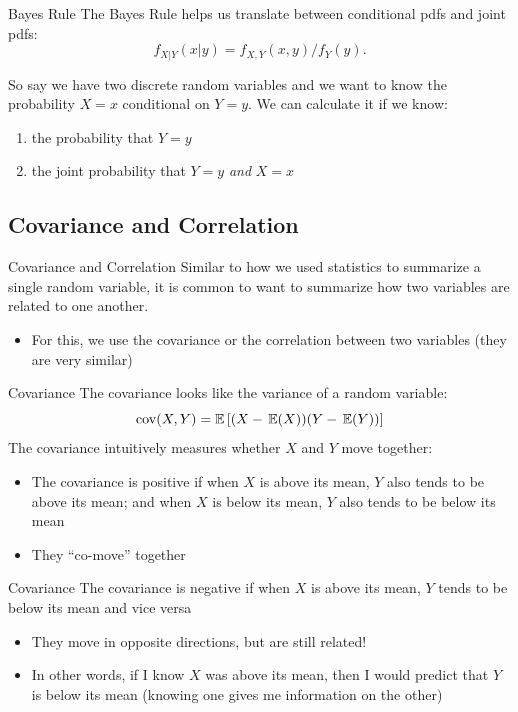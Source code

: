 \documentclass[aspectratio=169,t,11pt,table]{beamer}
\begin{document}
\begin{frame}{Bayes Rule}
  The \alert{Bayes Rule} helps us translate between conditional pdfs and joint pdfs:
  \[
    f_{X \vert Y}(x \vert y) = f_{X,Y}(x, y) / f_{Y}(y).
  \]
  
  \pause
  \bigskip
  So say we have two discrete random variables and we want to know the probability $X = x$ conditional on $Y = y$. We can calculate it if we know:
  \begin{enumerate}
    \item the probability that $Y = y$
    \item the joint probability that $Y = y$ \emph{and} $X = x$
  \end{enumerate}
\end{frame}

\subsection*{Covariance and Correlation}

\begin{frame}{Covariance and Correlation}
  Similar to how we used statistics to summarize a single random variable, it is common to want to summarize how two variables are related to one another.
  \begin{itemize}
    \item For this, we use the \alert{covariance} or the \alert{correlation} between two variables (they are very similar)
  \end{itemize}
\end{frame}

\begin{frame}{Covariance}
  The covariance looks like the variance of a random variable:
  \[
    \cov(X, Y) = \mathbb{E}\left[ (X - \expec{X}) (Y - \expec{Y}) \right]
  \]
  The covariance intuitively measures whether $X$ and $Y$ move together:
  \begin{itemize}
    \item The covariance is positive if when $X$ is above its mean, $Y$ also tends to be above its mean; and when $X$ is below its mean, $Y$ also tends to be below its mean
    \item They ``co-move'' together
  \end{itemize}
\end{frame}

\begin{frame}{Covariance}
  The covariance is negative if when $X$ is above its mean, $Y$ tends to be below its mean and vice versa
  \begin{itemize}
    \item They move in opposite directions, but are still related!
    
    \pause
    \item In other words, if I know $X$ was above its mean, then I would predict that $Y$ is below its mean (knowing one gives me information on the other)
  \end{itemize}
\end{frame}
\end{document}

